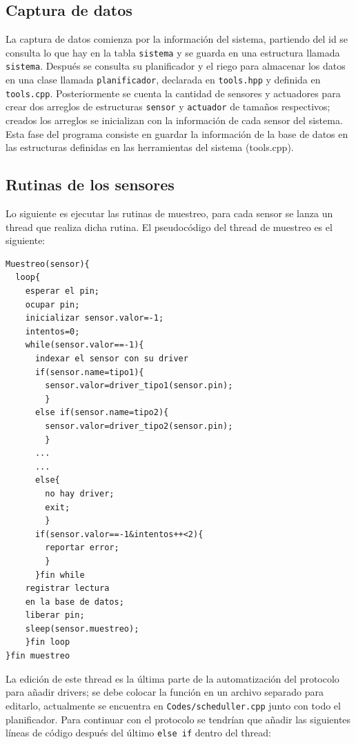 \documentclass[10pt,twocolumn]{article}
\begin{document}
\subsection{Captura de datos}
La captura de datos comienza por la informaci\'on del sistema, partiendo del id se consulta lo que hay en la tabla \verb|sistema| y se guarda en una estructura 
llamada \verb|sistema|. Despu\'es se 
consulta su planificador y el riego para almacenar los datos en una clase llamada 
\verb|planificador|, declarada en \verb|tools.hpp| y definida en \verb|tools.cpp|. Posteriormente se cuenta la cantidad de sensores y actuadores para crear dos arreglos de 
estructuras \verb|sensor| y \verb|actuador| de tama\~nos respectivos; creados los arreglos se inicializan con la informaci\'on de cada sensor del sistema. Esta fase del 
programa consiste en guardar la informaci\'on de la base de datos en las estructuras definidas en las herramientas del sistema (tools.cpp). 
 
\subsection{Rutinas de los sensores}
Lo siguiente es ejecutar las rutinas de muestreo, para cada sensor se lanza un thread que realiza dicha rutina. El pseudoc\'odigo del thread de muestreo es el siguiente:

\begin{verbatim}
Muestreo(sensor){
  loop{
    esperar el pin;
    ocupar pin;
    inicializar sensor.valor=-1;
    intentos=0;
    while(sensor.valor==-1){
      indexar el sensor con su driver
      if(sensor.name=tipo1){
        sensor.valor=driver_tipo1(sensor.pin);
        }
      else if(sensor.name=tipo2){
        sensor.valor=driver_tipo2(sensor.pin);
        } 
      ...
      ...
      else{
        no hay driver;
        exit;
        }
      if(sensor.valor==-1&intentos++<2){
        reportar error;
        }
      }fin while
    registrar lectura
    en la base de datos;
    liberar pin;
    sleep(sensor.muestreo);
    }fin loop
}fin muestreo
\end{verbatim}

La edici\'on de este thread es la 
\'ultima parte 
de la automatizaci\'on del protocolo para a\~nadir drivers; se debe colocar la funci\'on en un archivo separado para editarlo, actualmente se encuentra en 
\verb|Codes/scheduller.cpp| junto con todo el planificador. Para continuar con el protocolo se tendr\'ian que a\~nadir las siguientes l\'ineas de c\'odigo despu\'es 
del \'ultimo \verb|else if| dentro del thread:
\end{document}
